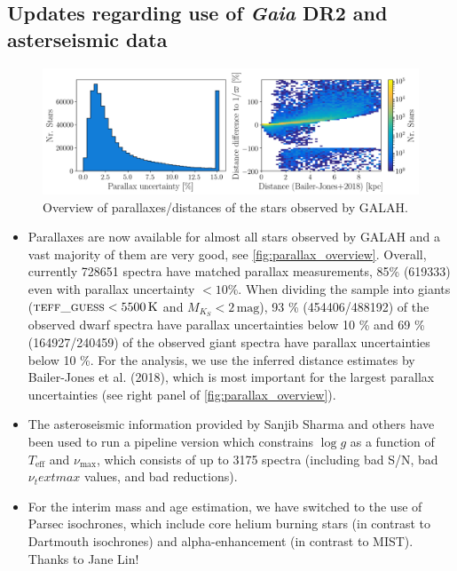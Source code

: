 \documentclass[a4paper,11pt,english]{article}
\begin{document}
\subsection{Updates regarding use of \textit{Gaia} DR2 and asterseismic data}

\begin{figure}[!ht]
\centering
\includegraphics[width=\textwidth]{../../input/figures/parallax_uncertainties.png}
\caption{Overview of parallaxes/distances of the stars observed by GALAH.}
\label{fig:parallax_overview}
\end{figure}

\begin{itemize}
\item Parallaxes are now available for almost all stars observed by GALAH and a vast majority of them are very good, see \autoref{fig:parallax_overview}. Overall, currently 728651 spectra have matched parallax measurements, 85\% (619333) even with parallax uncertainty $< 10\%$. When dividing the sample into giants ($\textsc{teff\_guess} < 5500\,\mathrm{K}$ and $M_{K_S} < 2\,\mathrm{mag}$), 93 \% (454406/488192) of the observed dwarf spectra have parallax uncertainties below 10 \% and 69 \% (164927/240459) of the observed giant spectra have parallax uncertainties below 10 \%. For the analysis, we use the inferred distance estimates by Bailer-Jones et al. (2018), which is most important for the largest parallax uncertainties (see right panel of \autoref{fig:parallax_overview}).
\item The asteroseismic information provided by Sanjib Sharma and others have been used to run a pipeline version which constrains $\log g$ as a function of $T_\text{eff}$ and $\nu_\text{max}$, which consists of up to 3175 spectra (including bad S/N, bad $\nu_text{max}$ values, and bad reductions).
\item For the interim mass and age estimation, we have switched to the use of Parsec isochrones, which include core helium burning stars (in contrast to Dartmouth isochrones) and alpha-enhancement (in contrast to MIST). Thanks to Jane Lin!
\end{itemize}
\end{document}
